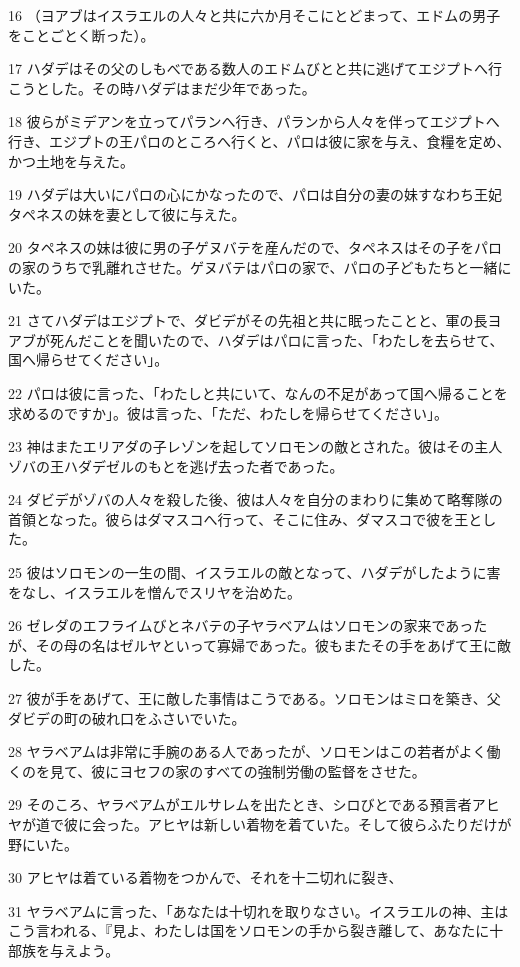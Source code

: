 \par 16 （ヨアブはイスラエルの人々と共に六か月そこにとどまって、エドムの男子をことごとく断った）。
\par 17 ハダデはその父のしもべである数人のエドムびとと共に逃げてエジプトへ行こうとした。その時ハダデはまだ少年であった。
\par 18 彼らがミデアンを立ってパランへ行き、パランから人々を伴ってエジプトへ行き、エジプトの王パロのところへ行くと、パロは彼に家を与え、食糧を定め、かつ土地を与えた。
\par 19 ハダデは大いにパロの心にかなったので、パロは自分の妻の妹すなわち王妃タペネスの妹を妻として彼に与えた。
\par 20 タペネスの妹は彼に男の子ゲヌバテを産んだので、タペネスはその子をパロの家のうちで乳離れさせた。ゲヌバテはパロの家で、パロの子どもたちと一緒にいた。
\par 21 さてハダデはエジプトで、ダビデがその先祖と共に眠ったことと、軍の長ヨアブが死んだことを聞いたので、ハダデはパロに言った、「わたしを去らせて、国へ帰らせてください」。
\par 22 パロは彼に言った、「わたしと共にいて、なんの不足があって国へ帰ることを求めるのですか」。彼は言った、「ただ、わたしを帰らせてください」。
\par 23 神はまたエリアダの子レゾンを起してソロモンの敵とされた。彼はその主人ゾバの王ハダデゼルのもとを逃げ去った者であった。
\par 24 ダビデがゾバの人々を殺した後、彼は人々を自分のまわりに集めて略奪隊の首領となった。彼らはダマスコへ行って、そこに住み、ダマスコで彼を王とした。
\par 25 彼はソロモンの一生の間、イスラエルの敵となって、ハダデがしたように害をなし、イスラエルを憎んでスリヤを治めた。
\par 26 ゼレダのエフライムびとネバテの子ヤラベアムはソロモンの家来であったが、その母の名はゼルヤといって寡婦であった。彼もまたその手をあげて王に敵した。
\par 27 彼が手をあげて、王に敵した事情はこうである。ソロモンはミロを築き、父ダビデの町の破れ口をふさいでいた。
\par 28 ヤラベアムは非常に手腕のある人であったが、ソロモンはこの若者がよく働くのを見て、彼にヨセフの家のすべての強制労働の監督をさせた。
\par 29 そのころ、ヤラベアムがエルサレムを出たとき、シロびとである預言者アヒヤが道で彼に会った。アヒヤは新しい着物を着ていた。そして彼らふたりだけが野にいた。
\par 30 アヒヤは着ている着物をつかんで、それを十二切れに裂き、
\par 31 ヤラベアムに言った、「あなたは十切れを取りなさい。イスラエルの神、主はこう言われる、『見よ、わたしは国をソロモンの手から裂き離して、あなたに十部族を与えよう。
